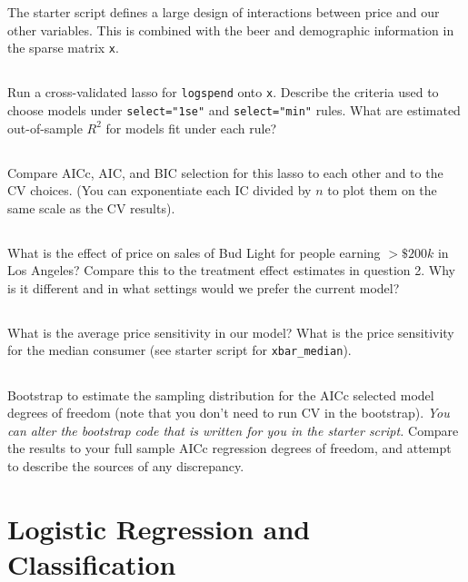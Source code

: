 \documentclass[12pt]{article}
\begin{document}
The starter script defines a large design of interactions between price and our other variables.  This is combined with the beer and demographic information in the sparse matrix {\tt x}.

\subsection{}
Run a cross-validated lasso for {\tt logspend} onto {\tt x}.
Describe the criteria used to choose models under {\tt select="1se"} and {\tt select="min"} rules.  What are estimated out-of-sample $R^2$ for models fit under each rule?

\subsection{} Compare AICc, AIC, and BIC selection for this lasso to each other and to the CV choices.  (You can exponentiate each IC divided by $n$ to plot them on the same scale as the CV results).

\subsection{} What is the effect of price on sales of Bud Light for people earning $>\$200k$ in Los Angeles?  Compare this to the treatment effect estimates in question 2.  Why is it different and in what settings would we prefer the current model?

\subsection{} What is the average price sensitivity in our model?  What is the price sensitivity for the median consumer (see starter script for {\tt xbar\_median}).

\subsection{} Bootstrap to estimate  the sampling distribution for the AICc selected model degrees of freedom (note that you don't need to run CV in the bootstrap).  \textit{You can alter the bootstrap code that is written for you in the starter script.}  Compare the results to your full sample AICc regression degrees of freedom, and attempt to describe the sources of any discrepancy.

\newpage
\section{Logistic Regression and Classification}
\end{document}
